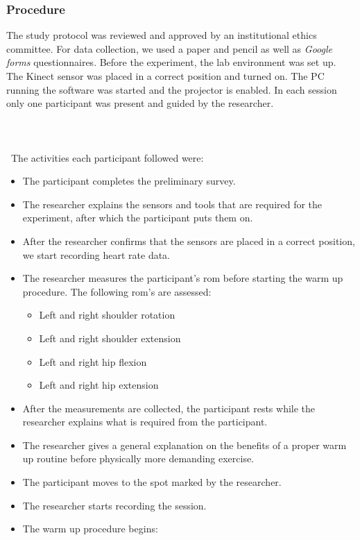 \subsubsection{Procedure}
The study protocol was reviewed and approved by an institutional ethics committee. For data collection, we used a  paper and pencil as well as \textit{Google forms} questionnaires. Before the experiment, the lab environment was set up. The Kinect sensor was placed in a correct position and turned on. The PC running the software was started and the projector is enabled. In each session only one participant was present and guided by the researcher.\\\\\\\\\ The activities each participant followed were:
\begin{itemize}
\item The participant completes the preliminary survey.
\item The researcher explains the sensors and tools that are required for the experiment, after which the participant puts them on. 
\item After the researcher confirms that the sensors are placed in a correct position, we start recording heart rate data.
\item The researcher measures the participant's \acrshort{rom} before starting the warm up procedure. The following \acrshort{rom}'s are assessed: 
\begin{itemize}
\item Left and right shoulder rotation
\item Left and right shoulder extension
\item Left and right hip flexion
\item Left and right hip extension
\end{itemize}
\item After the measurements are collected, the participant rests while the researcher explains what is required from the participant.
\item The researcher gives a general explanation on the benefits of a proper warm up routine before physically more demanding exercise.
\item The participant moves to the spot marked by the researcher.
\item The researcher starts recording the session. 
\item The warm up procedure begins:
\begin{itemize}

\end{itemize}
\end{itemize}
